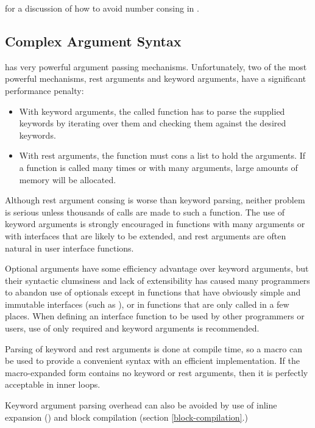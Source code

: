  for a discussion of how to avoid number consing
in \python.


\subsection{Complex Argument Syntax}

\clisp{} has very powerful argument passing mechanisms.  Unfortunately, two
of the most powerful mechanisms, rest arguments and keyword arguments, have a
significant performance penalty:

\begin{itemize}
\item
With keyword arguments, the called function has to parse the supplied keywords
by iterating over them and checking them against the desired keywords.

\item
With rest arguments, the function must cons a list to hold the arguments.  If a
function is called many times or with many arguments, large amounts of memory
will be allocated.
\end{itemize}

Although rest argument consing is worse than keyword parsing, neither problem
is serious unless thousands of calls are made to such a function.  The use of
keyword arguments is strongly encouraged in functions with many arguments or
with interfaces that are likely to be extended, and rest arguments are often
natural in user interface functions.

Optional arguments have some efficiency advantage over keyword
arguments, but their syntactic clumsiness and lack of extensibility
has caused many \clisp{} programmers to abandon use of optionals
except in functions that have obviously simple and immutable
interfaces (such as ), or in functions that are only
called in a few places.  When defining an interface function to be
used by other programmers or users, use of only required and keyword
arguments is recommended.

Parsing of  keyword and rest arguments is done at
compile time, so a macro can be used to provide a convenient syntax
with an efficient implementation.  If the macro-expanded form contains
no keyword or rest arguments, then it is perfectly acceptable in inner
loops.

Keyword argument parsing overhead can also be avoided by use of inline
expansion () and block compilation (section
\ref{block-compilation}.)

